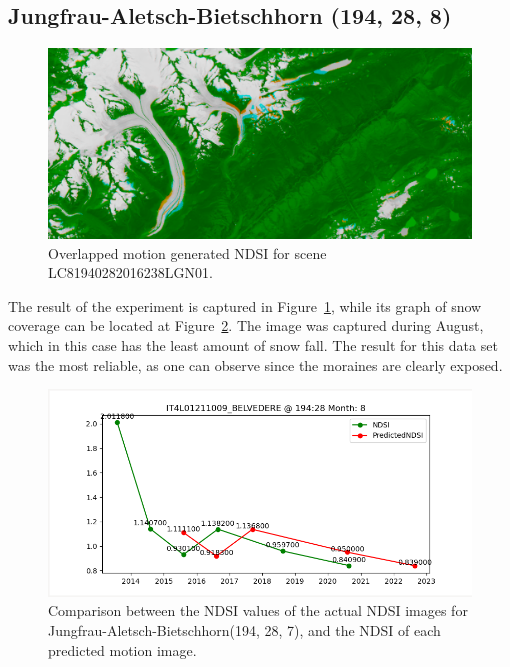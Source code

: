 \documentclass[12pt, a4paper]{report}
\begin{document}
	
	\newpage{}
	
	\subsection{Jungfrau-Aletsch-Bietschhorn (194, 28, 8)}
	
	\begin{figure}[h!]
		\centering
		\includegraphics[width=\linewidth]{../images/experiment_1940288_image.png}
		\caption{Overlapped motion generated NDSI for scene LC81940282016238LGN01.}
		\label{fig:experiment_1940288_image}
	\end{figure}

	The result of the experiment is captured in Figure~\ref{fig:experiment_1940288_image}, while its graph of snow coverage can be located at Figure~\ref{fig:jungfrau_194288}. The image was captured during August, which in this case has the least amount of snow fall. The result for this data set was the most reliable, as one can observe since the moraines are clearly exposed. 
	
	\begin{figure}[h!]
		\centering
		\includegraphics[scale=0.5]{../images/experiment_194288.png}
		\caption{Comparison between the NDSI values of the actual NDSI images for Jungfrau-Aletsch-Bietschhorn(194, 28, 7), and the NDSI of each predicted motion image.}
		\label{fig:jungfrau_194288}
	\end{figure}
	
\end{document}

